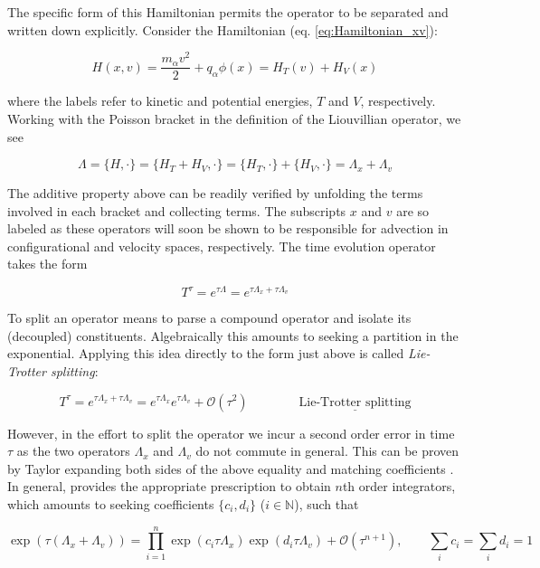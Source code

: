 \documentclass[11pt,titlepage]{report}
\begin{document}
The specific form of this Hamiltonian permits the operator to be separated and written down explicitly. Consider the Hamiltonian (eq. \eqref{eq:Hamiltonian_xv}):

$$H(x,v) = \frac{m_{\alpha}v^2}{2} + q_{\alpha}\phi(x) = H_T(v) + H_V(x)$$

\noindent where the labels refer to kinetic and potential energies, $T$ and $V$, respectively. Working with the Poisson bracket in the definition of the Liouvillian operator, we see

\begin{equation}\Lambda = \{H,\cdot\} = \{H_T + H_V,\cdot \} = \{H_T,\cdot\} + \{H_V,\cdot\} = \Lambda_x + \Lambda_v \label{eq:Lambdax_Lambdav}\end{equation}

\noindent The additive property above can be readily verified by unfolding the terms involved in each bracket and collecting terms. The subscripts $x$ and $v$ are so labeled as these operators will soon be shown to be responsible for advection in configurational and velocity spaces, respectively. The time evolution operator takes the form

$$T^{\tau} = e^{\tau \Lambda} = e^{\tau \Lambda_x + \tau \Lambda_v}$$

\noindent To split an operator means to parse a compound operator and isolate its (decoupled) constituents. Algebraically this amounts to seeking a partition in the exponential. Applying this idea directly to the form just above is called \emph{Lie-Trotter splitting}:

$$ T^{\tau} = e^{\tau \Lambda_x + \tau \Lambda_v} = e^{\tau \Lambda_x}e^{\tau \Lambda_v} + \mathcal{O}(\tau^2)\qquad \qquad \underline{\textrm{Lie-Trotter splitting}}$$

\noindent However, in the effort to split the operator we incur a second order error in time $\tau$ as the two operators $\Lambda_x$ and $\Lambda_v$ do not commute in general. This can be proven by Taylor expanding both sides of the above equality and matching coefficients \cite{Yoshida90}. In general, \cite{Blanes02, Crouseilles11, Yoshida93} provides the appropriate prescription to obtain $n$th order integrators, which amounts to seeking coefficients $\{c_i,d_i\}$ ($i\in\mathbb{N}$), such that

\begin{equation}\exp (\tau (\Lambda_x + \Lambda_v)) = \prod_{i = 1}^n \exp (c_i\tau \Lambda_x)\exp (d_i\tau \Lambda_v) + \mathcal{O}(\tau^{n+1}), \qquad \sum_i c_i = \sum_i d_i = 1\label{eq:nth_order_scheme}\end{equation}
\end{document}
